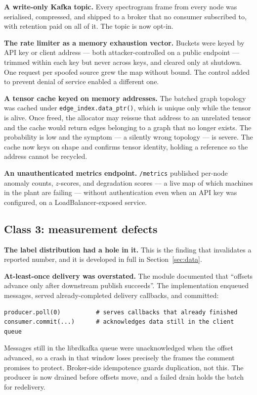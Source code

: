\documentclass[11pt]{article}
\begin{document}
\textbf{A write-only Kafka topic.} Every spectrogram frame from every node was
serialised, compressed, and shipped to a broker that no consumer subscribed to,
with retention paid on all of it. The topic is now opt-in.

\textbf{The rate limiter as a memory exhaustion vector.} Buckets were keyed by
API key or client address --- both attacker-controlled on a public endpoint ---
trimmed within each key but never across keys, and cleared only at shutdown. One
request per spoofed source grew the map without bound. The control added to
prevent denial of service enabled a different one.

\textbf{A tensor cache keyed on memory addresses.} The batched graph topology was
cached under \texttt{edge\_index.data\_ptr()}, which is unique only while the
tensor is alive. Once freed, the allocator may reissue that address to an
unrelated tensor and the cache would return edges belonging to a graph that no
longer exists. The probability is low and the symptom --- a silently wrong
topology --- is severe. The cache now keys on shape and confirms tensor identity,
holding a reference so the address cannot be recycled.

\textbf{An unauthenticated metrics endpoint.} \texttt{/metrics} published
per-node anomaly counts, $z$-scores, and degradation scores --- a live map of
which machines in the plant are failing --- without authentication even when an
API key was configured, on a LoadBalancer-exposed service.

\subsection{Class 3: measurement defects}

\textbf{The label distribution had a hole in it.} This is the finding that
invalidates a reported number, and it is developed in full in
Section~\ref{sec:data}.

\textbf{At-least-once delivery was overstated.} The module documented that
``offsets advance only after downstream publish succeeds''. The implementation
enqueued messages, served already-completed delivery callbacks, and committed:

\begin{lstlisting}
producer.poll(0)          # serves callbacks that already finished
consumer.commit(...)      # acknowledges data still in the client queue
\end{lstlisting}

Messages still in the librdkafka queue were unacknowledged when the offset
advanced, so a crash in that window loses precisely the frames the comment
promises to protect. Broker-side idempotence guards duplication, not this. The
producer is now drained before offsets move, and a failed drain holds the batch
for redelivery.
\end{document}

